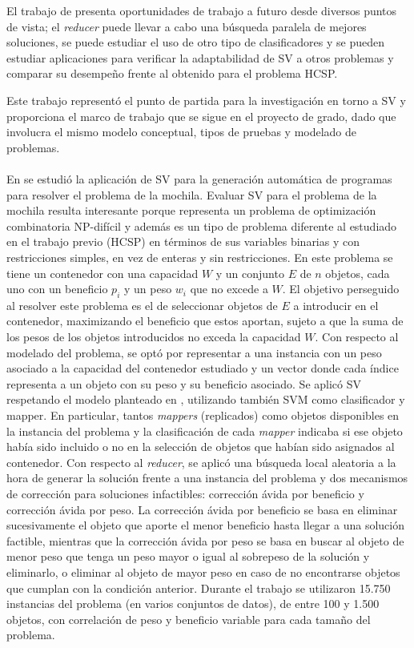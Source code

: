 El trabajo de \citet{savant-original} presenta oportunidades de trabajo a futuro desde diversos puntos de vista; el \textit{reducer} puede llevar a cabo una búsqueda paralela de mejores soluciones, se puede estudiar el uso de otro tipo de clasificadores y se pueden estudiar aplicaciones para verificar la adaptabilidad de SV a otros problemas y comparar su desempeño frente al obtenido para el problema HCSP. 

Este trabajo representó el punto de partida para la investigación en torno a SV y proporciona el marco de trabajo que se sigue en el proyecto de grado, dado que involucra el mismo modelo conceptual, tipos de pruebas y modelado de problemas.

\paragraph{}En \citet{savant-bag} se estudió la aplicación de SV para la generación automática de programas para resolver el problema de la mochila.
Evaluar SV para el problema de la mochila resulta interesante porque representa un problema de optimización combinatoria NP-difícil y además es un tipo de problema diferente al estudiado en el trabajo previo (HCSP) en términos de sus variables binarias y con restricciones simples, en vez de enteras y sin restricciones.
En este problema se tiene un contenedor con una capacidad $W$ y un conjunto $E$ de $n$ objetos, cada uno con un beneficio $p_i$ y un peso $w_i$ que no excede a $W$. El objetivo perseguido al resolver este problema es el de seleccionar objetos de $E$ a introducir en el contenedor, maximizando el beneficio que estos aportan, sujeto a que la suma de los pesos de los objetos introducidos no exceda la capacidad $W$. Con respecto al modelado del problema, se optó por representar a una instancia con un peso asociado a la capacidad del contenedor estudiado y un vector donde cada índice representa a un objeto con su peso y su beneficio asociado.
Se aplicó SV respetando el modelo planteado en \citet{savant-original}, utilizando también SVM como clasificador y mapper. En particular, tantos \textit{mappers} (replicados) como objetos disponibles en la instancia del problema y la clasificación de cada \textit{mapper} indicaba si ese objeto había sido incluido o no en la selección de objetos que habían sido asignados al contenedor. Con respecto al \textit{reducer}, se aplicó una búsqueda local aleatoria a la hora de generar la solución frente a una instancia del problema y dos mecanismos de corrección para soluciones infactibles: corrección ávida por beneficio y corrección ávida por peso. La corrección ávida por beneficio se basa en eliminar sucesivamente el objeto que aporte el menor beneficio hasta llegar a una solución factible, mientras que la corrección ávida por peso se basa en buscar al objeto de menor peso que tenga un peso mayor o igual al sobrepeso de la solución y eliminarlo, o eliminar al objeto de mayor peso en caso de no encontrarse objetos que cumplan con la condición anterior. Durante el trabajo se utilizaron 15.750 instancias del problema (en varios conjuntos de datos), de entre 100 y 1.500 objetos, con correlación de peso y beneficio variable para cada tamaño del problema.
